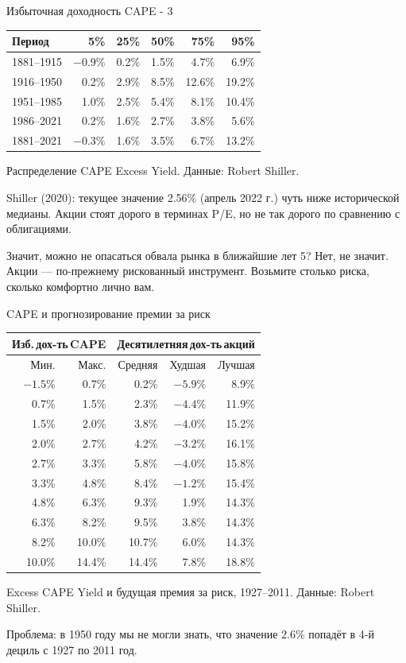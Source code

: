 \documentclass{beamer}
\begin{document}
\begin{frame}{Избыточная доходность CAPE - 3}
\centering
\begin{tabular}{l|r|r|r|r|r}
Период     &      5\% &  25\% &  50\% &   75\% &   95\% \\ \hline 
1881--1915 & $-0.9\%$ & 0.2\% & 1.5\% &  4.7\% &  6.9\% \\ 
1916--1950 &    0.2\% & 2.9\% & 8.5\% & 12.6\% & 19.2\% \\
1951--1985 &    1.0\% & 2.5\% & 5.4\% &  8.1\% & 10.4\% \\
1986--2021 &    0.2\% & 1.6\% & \alert{2.7\%} &  3.8\% &  5.6\% \\ \hline
1881--2021 & $-0.3\%$ & 1.6\% & \alert{3.5\%} &  6.7\% & 13.2\%
\end{tabular}

\centering
{\scriptsize Распределение CAPE Excess Yield. Данные: Robert Shiller.}

\justify
Shiller (2020): текущее значение 2.56\% (апрель 2022 г.) чуть ниже 
исторической медианы. Акции стоят дорого в терминах P/E, но не так дорого по 
сравнению с облигациями.

\justify
Значит, можно не опасаться обвала рынка в ближайшие лет 5? Нет, не значит. 
Акции --- по-прежнему рискованный инструмент. Возьмите столько риска, сколько 
комфортно лично вам.
\end{frame}



\begin{frame}{CAPE и прогнозирование премии за риск}
\centering
\begin{tabular}{r|r|r|r|r}
\multicolumn{2}{c|}{Изб.\,дох-ть\,CAPE} &
\multicolumn{3}{c}{Десятилетняя\,дох-ть\,акций} \\
\hline
Мин. & Макс. & Средняя & Худшая & Лучшая \\
\hline
$-1.5\%$ &  0.7\% &  0.2\% & $-5.9\%$ &  8.9\% \\
  0.7\%  &  1.5\% &  2.3\% & $-4.4\%$ & 11.9\% \\
  1.5\%  &  2.0\% &  3.8\% & $-4.0\%$ & 15.2\% \\
\hline
  \alert{2.0\%}  &  \alert{2.7\%} &  \alert{4.2\%} & \alert{$-3.2\%$} & \alert{16.1\%} \\ 
\hline
  2.7\%  &  3.3\% &  5.8\% & $-4.0\%$ & 15.8\% \\
  3.3\%  &  4.8\% &  8.4\% & $-1.2\%$ & 15.4\% \\
  4.8\%  &  6.3\% &  9.3\% &   1.9\%  & 14.3\% \\
  6.3\%  &  8.2\% &  9.5\% &   3.8\%  & 14.3\% \\
  8.2\%  & 10.0\% & 10.7\% &   6.0\%  & 14.3\% \\ 
 10.0\%  & 14.4\% & 14.4\% &   7.8\%  & 18.8\%  
\end{tabular}

\centering
{\scriptsize Excess CAPE Yield и будущая премия за риск, 1927--2011. Данные: Robert Shiller.}

\justify
Проблема: в 1950 году мы не могли знать, что значение 2.6\% попадёт в 4-й 
дециль с 1927 по 2011 год.
\end{frame}
\end{document}
